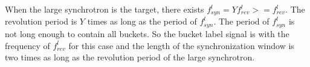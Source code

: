 When the large synchrotron is the target, there exists $f_{\mathit{syn}}^{l}=Yf_{\mathit{rev}}^{l}>=f_{\mathit{rev}}^{l}$. The revolution period is $Y$ times as long as the period of $f_{\mathit{syn}}^{l}$. The period of $f_{\mathit{syn}}^{l}$ is not long enough to contain all buckets. So the bucket label signal is with the frequency of $f_{\mathit{rev}}^{l}$ for this case and the length of the synchronization window is two times as long as the revolution period of the large synchrotron. 


